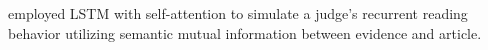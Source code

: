 \documentclass[sn-mathphys,Numbered]{sn-jnl}%
\theoremstyle{thmstyleone}%
\theoremstyle{thmstyletwo}%
\theoremstyle{thmstylethree}%
\begin{document}
 \citet{yang2019recurrent} employed LSTM with self-attention to simulate a judge's recurrent reading behavior utilizing semantic mutual information between evidence and article. %
\end{document}
